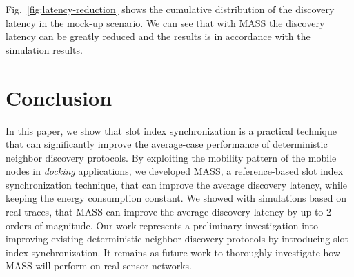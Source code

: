 \documentclass[twoside,twocolumn]{article}
\begin{document}
Fig.~\ref{fig:latency-reduction} shows the cumulative distribution of the
discovery latency in the mock-up scenario. We can see that with MASS the
discovery latency can be greatly reduced and the results is in accordance
with the simulation results.

\section{Conclusion}
\label{sec:conclusion}

In this paper, we show that slot index synchronization is a practical
technique that can significantly improve the average-case performance
of deterministic neighbor discovery protocols. By exploiting the
mobility pattern of the mobile nodes in \emph{docking} applications,
we developed MASS, a reference-based slot index synchronization
technique, that can improve the average discovery latency, while
keeping the energy consumption constant.  We showed with simulations
based on real traces, that MASS can improve the average discovery
latency by up to 2 orders of magnitude. Our work represents a
preliminary investigation into improving existing deterministic
neighbor discovery protocols by introducing slot index
synchronization. It remains as future work to thoroughly investigate
how MASS will perform on real sensor networks.






\end{document}
